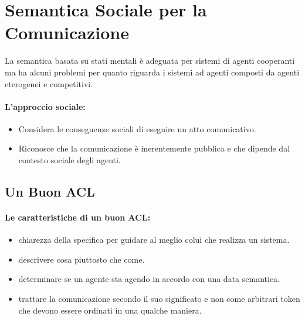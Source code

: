 
\section{Semantica Sociale per la Comunicazione}

La semantica basata su stati mentali è adeguata per sistemi di agenti cooperanti ma ha alcuni problemi per quanto riguarda i sistemi ad agenti composti da agenti eterogenei e competitivi. 


\paragraph{L'approccio sociale:}

\begin{itemize}
  \item Considera le conseguenze sociali di eseguire un atto comunicativo. 
  \item Riconosce che la comunicazione è inerentemente pubblica e che dipende dal contesto sociale degli agenti.
\end{itemize}

\subsection{Un Buon ACL}

\paragraph{Le caratteristiche di un buon ACL:}

\begin{itemize}
  \item {} chiarezza della specifica per guidare al meglio colui che realizza un sistema. 
  \item {} descrivere cosa piuttosto che come. 
  \item {} determinare se un agente sta agendo in accordo con una data semantica. 
  \item {} trattare la comunicazione secondo il suo significato e non come arbitrari token che devono essere ordinati in una qualche maniera.
\end{itemize}

